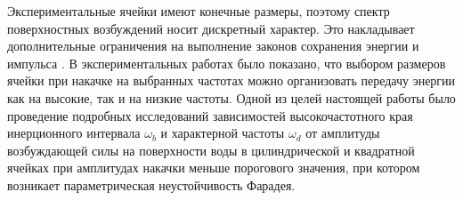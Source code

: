 






Экспериментальные ячейки имеют конечные размеры, поэтому спектр поверхностных возбуждений носит дискретный характер. Это накладывает дополнительные ограничения на выполнение законов сохранения энергии и импульса \cite{Kartashova1991}. В экспериментальных работах \cite{Brazhnikov2014, Aburakhimov2015} было показано, что выбором размеров ячейки при накачке на выбранных частотах можно организовать передачу энергии как на высокие, так и на низкие частоты.
Одной из целей настоящей работы было проведение подробных исследований зависимостей высокочастотного края инерционного интервала $\omega_b$ и характерной частоты $\omega_d$ от амплитуды возбуждающей силы на поверхности воды в цилиндрической и квадратной ячейках при амплитудах накачки меньше порогового значения, при котором возникает параметрическая неустойчивость Фарадея.

